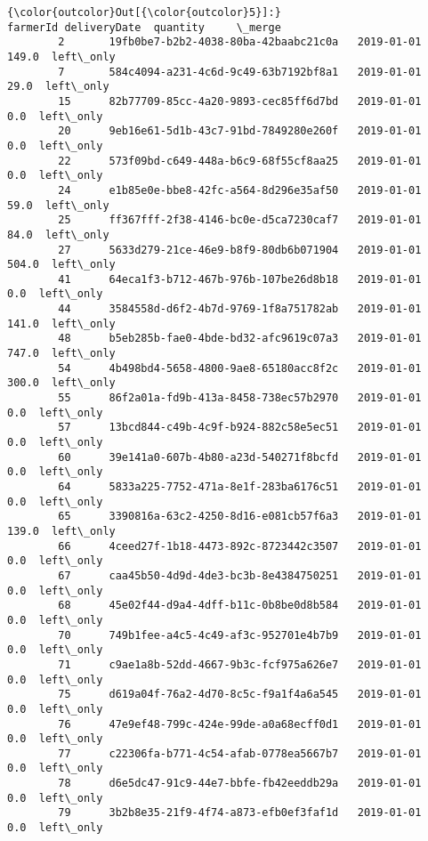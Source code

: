 \documentclass[11pt]{article}
\begin{document}
\begin{Verbatim}[commandchars=\\\{\}]
{\color{outcolor}Out[{\color{outcolor}5}]:}                                     farmerId deliveryDate  quantity     \_merge
        2       19fb0be7-b2b2-4038-80ba-42baabc21c0a   2019-01-01     149.0  left\_only
        7       584c4094-a231-4c6d-9c49-63b7192bf8a1   2019-01-01      29.0  left\_only
        15      82b77709-85cc-4a20-9893-cec85ff6d7bd   2019-01-01       0.0  left\_only
        20      9eb16e61-5d1b-43c7-91bd-7849280e260f   2019-01-01       0.0  left\_only
        22      573f09bd-c649-448a-b6c9-68f55cf8aa25   2019-01-01       0.0  left\_only
        24      e1b85e0e-bbe8-42fc-a564-8d296e35af50   2019-01-01      59.0  left\_only
        25      ff367fff-2f38-4146-bc0e-d5ca7230caf7   2019-01-01      84.0  left\_only
        27      5633d279-21ce-46e9-b8f9-80db6b071904   2019-01-01     504.0  left\_only
        41      64eca1f3-b712-467b-976b-107be26d8b18   2019-01-01       0.0  left\_only
        44      3584558d-d6f2-4b7d-9769-1f8a751782ab   2019-01-01     141.0  left\_only
        48      b5eb285b-fae0-4bde-bd32-afc9619c07a3   2019-01-01     747.0  left\_only
        54      4b498bd4-5658-4800-9ae8-65180acc8f2c   2019-01-01     300.0  left\_only
        55      86f2a01a-fd9b-413a-8458-738ec57b2970   2019-01-01       0.0  left\_only
        57      13bcd844-c49b-4c9f-b924-882c58e5ec51   2019-01-01       0.0  left\_only
        60      39e141a0-607b-4b80-a23d-540271f8bcfd   2019-01-01       0.0  left\_only
        64      5833a225-7752-471a-8e1f-283ba6176c51   2019-01-01       0.0  left\_only
        65      3390816a-63c2-4250-8d16-e081cb57f6a3   2019-01-01     139.0  left\_only
        66      4ceed27f-1b18-4473-892c-8723442c3507   2019-01-01       0.0  left\_only
        67      caa45b50-4d9d-4de3-bc3b-8e4384750251   2019-01-01       0.0  left\_only
        68      45e02f44-d9a4-4dff-b11c-0b8be0d8b584   2019-01-01       0.0  left\_only
        70      749b1fee-a4c5-4c49-af3c-952701e4b7b9   2019-01-01       0.0  left\_only
        71      c9ae1a8b-52dd-4667-9b3c-fcf975a626e7   2019-01-01       0.0  left\_only
        75      d619a04f-76a2-4d70-8c5c-f9a1f4a6a545   2019-01-01       0.0  left\_only
        76      47e9ef48-799c-424e-99de-a0a68ecff0d1   2019-01-01       0.0  left\_only
        77      c22306fa-b771-4c54-afab-0778ea5667b7   2019-01-01       0.0  left\_only
        78      d6e5dc47-91c9-44e7-bbfe-fb42eeddb29a   2019-01-01       0.0  left\_only
        79      3b2b8e35-21f9-4f74-a873-efb0ef3faf1d   2019-01-01       0.0  left\_only

\end{Verbatim}
\end{document}
